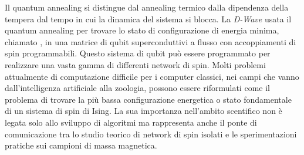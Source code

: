 Il quantum annealing si distingue dal annealing termico dalla dipendenza della tempera dal tempo in cui la dinamica del sistema si blocca. La \textit{D-Wave} usata il quantum annealing per trovare lo stato di configurazione di energia minima, chiamato , in una matrice di qubit superconduttivi a flusso con accoppiamenti di spin programmabili. Questo sistema di qubit può essere programmato per realizzare una vasta gamma di differenti network di spin. Molti problemi attualmente di computazione difficile per i computer classici, nei campi che vanno dall'intelligenza artificiale alla zoologia, possono essere riformulati come il problema di trovare la più bassa configurazione energetica o stato fondamentale di un sistema di spin di Ising. La sua importanza nell'ambito scentifico non è legata solo allo sviluppo di algoritmi ma rappresenta anche il ponte di comunicazione tra lo studio teorico di network di spin isolati e le sperimentazioni pratiche sui campioni di massa magnetica.
